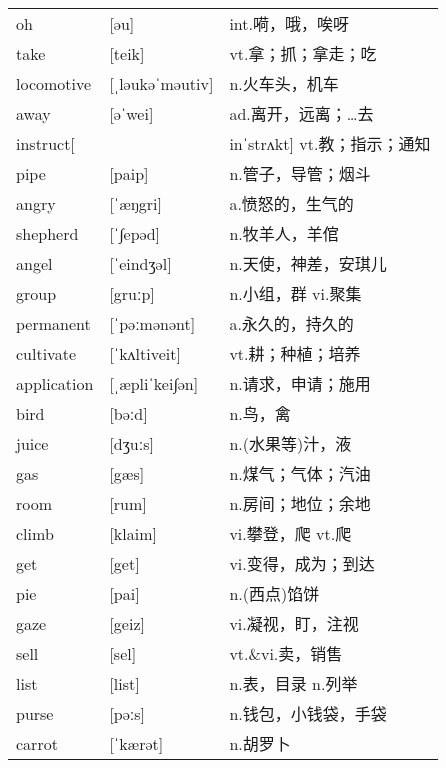 \documentclass[a4paper]{article}
\begin{document}
\section{}
\begin{tabular}{l l l}

oh & [əu] & int.嗬，哦，唉呀 \\
take & [teik] & vt.拿；抓；拿走；吃 \\
locomotive & [ˌləukəˈməutiv] & n.火车头，机车 \\
away & [əˈwei] & ad.离开，远离；…去 \\
instruct[ &  & inˈstrʌkt] vt.教；指示；通知 \\
pipe & [paip] & n.管子，导管；烟斗 \\
angry & [ˈæŋgri] & a.愤怒的，生气的 \\
shepherd & [ˈ∫epəd] & n.牧羊人，羊倌 \\
angel & [ˈeindʒəl] & n.天使，神差，安琪儿 \\
group & [gruːp] & n.小组，群 vi.聚集 \\
permanent & [ˈpəːmənənt] & a.永久的，持久的 \\
cultivate & [ˈkʌltiveit] & vt.耕；种植；培养 \\
application & [ˌæpliˈkei∫ən] & n.请求，申请；施用 \\
bird & [bəːd] & n.鸟，禽 \\
juice & [dʒuːs] & n.(水果等)汁，液 \\
gas & [gæs] & n.煤气；气体；汽油 \\
room & [rum] & n.房间；地位；余地 \\
climb & [klaim] & vi.攀登，爬 vt.爬 \\
get & [get] & vi.变得，成为；到达 \\
pie & [pai] & n.(西点)馅饼 \\
gaze & [geiz] & vi.凝视，盯，注视 \\
sell & [sel] & vt.\&vi.卖，销售 \\
list & [list] & n.表，目录 n.列举 \\
purse & [pəːs] & n.钱包，小钱袋，手袋 \\
carrot & [ˈkærət] & n.胡罗卜 \\

\end{tabular}
\end{document}
